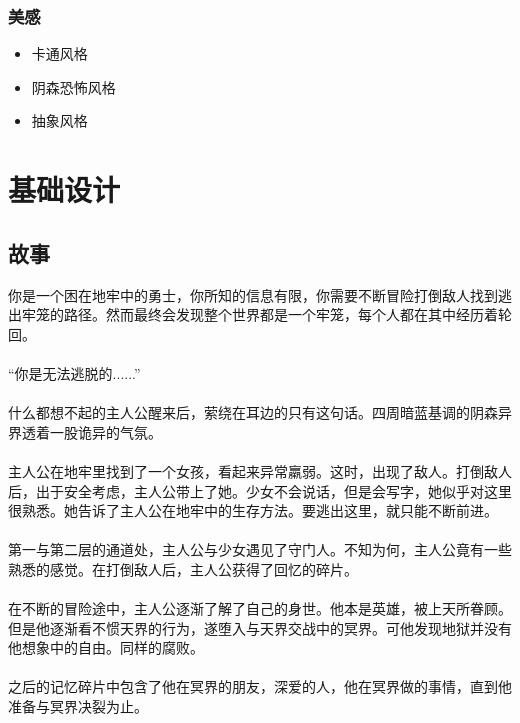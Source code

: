 \documentclass{article}
\begin{document}
\subsubsection{美感}
\begin{itemize}
	\item 卡通风格
	\item 阴森恐怖风格
	\item 抽象风格
\end{itemize}

\section{基础设计}
\subsection{故事}
你是一个困在地牢中的勇士，你所知的信息有限，你需要不断冒险打倒敌人找到逃出牢笼的路径。然而最终会发现整个世界都是一个牢笼，每个人都在其中经历着轮回。 
\paragraph{}
“你是无法逃脱的......” 
\paragraph{}
什么都想不起的主人公醒来后，萦绕在耳边的只有这句话。四周暗蓝基调的阴森异界透着一股诡异的气氛。
\paragraph{}
主人公在地牢里找到了一个女孩，看起来异常羸弱。这时，出现了敌人。打倒敌人后，出于安全考虑，主人公带上了她。少女不会说话，但是会写字，她似乎对这里很熟悉。她告诉了主人公在地牢中的生存方法。要逃出这里，就只能不断前进。
\paragraph{}
第一与第二层的通道处，主人公与少女遇见了守门人。不知为何，主人公竟有一些熟悉的感觉。在打倒敌人后，主人公获得了回忆的碎片。
\paragraph{}
在不断的冒险途中，主人公逐渐了解了自己的身世。他本是英雄，被上天所眷顾。但是他逐渐看不惯天界的行为，遂堕入与天界交战中的冥界。可他发现地狱并没有他想象中的自由。同样的腐败。
\paragraph{}
之后的记忆碎片中包含了他在冥界的朋友，深爱的人，他在冥界做的事情，直到他准备与冥界决裂为止。
\end{document}
